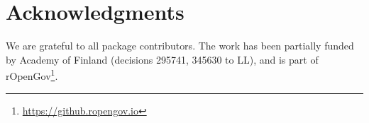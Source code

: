 
\section*{Acknowledgments}

We are grateful to all package contributors. The work has been partially funded by Academy of Finland (decisions 295741, 345630 to LL), and is part of rOpenGov\footnote{\url{https://github.ropengov.io}}.




  

\address{M\r{a}ns Magnusson\\
  Department of Computer Science\\
  Aalto University\\
  Finland\\}


\address{Leo Lahti\\
  Department of Computing\\
  PO Box 20014 University of Turku\\
  Finland\\}
